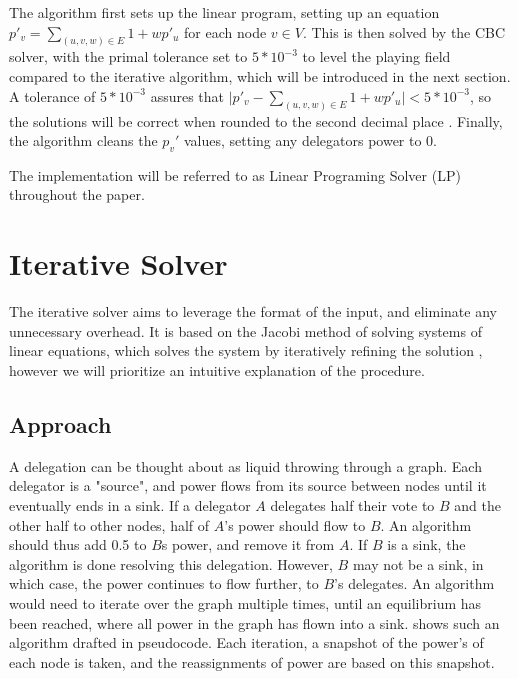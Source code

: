 The algorithm first sets up the linear program, setting up an equation $p'_v = \sum_{(u, v, w) \in E} 1 + wp'_u$ for each node $v \in V$. This is then solved by the CBC solver, with the primal tolerance set to $5*10^{-3}$ to level the playing field compared to the iterative algorithm, which will be introduced in the next section. A tolerance of $5 * 10^{-3}$ assures that $\lvert p'_v -\sum_{(u, v, w) \in E} 1 + wp'_u \rvert < 5*10^{-3}$, so the solutions will be correct when rounded to the second decimal place \cite{forrestCBCUserGuide2005}. Finally, the algorithm cleans the $p_v'$ values, setting any delegators power to 0. 

The implementation will be referred to as Linear Programing Solver (LP) throughout the paper.

\section{Iterative Solver}

The iterative solver aims to leverage the format of the input, and eliminate any unnecessary overhead. It is based on the Jacobi method of solving systems of linear equations, which solves the system by iteratively refining the solution \cite{burden2011numerical}, however we will prioritize an intuitive explanation of the procedure.

\subsection{Approach}

A delegation can be thought about as liquid throwing through a graph. Each delegator is a "source", and power flows from its source between nodes until it eventually ends in a sink. If a delegator $A$ delegates half their vote to $B$ and the other half to other nodes, half of $A$'s power should flow to $B$. An algorithm should thus add 0.5 to $B$s power, and remove it from $A$. If $B$ is a sink, the algorithm is done resolving this delegation. However, $B$ may not be a sink, in which case, the power continues to flow further, to $B$'s delegates. An algorithm would need to iterate over the graph multiple times, until an equilibrium has been reached, where all power in the graph has flown into a sink.  shows such an algorithm drafted in pseudocode. Each iteration, a snapshot of the power's of each node is taken, and the reassignments of power are based on this snapshot\footnotemark.  

